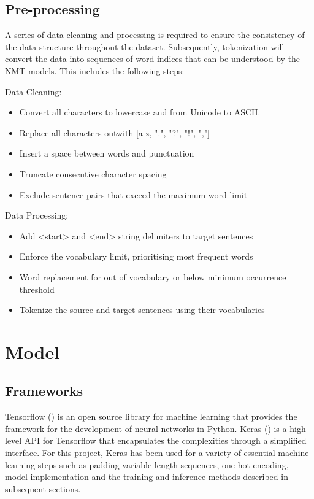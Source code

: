 \subsection{Pre-processing}

A series of data cleaning and processing is required to ensure the consistency of the data structure throughout the dataset. Subsequently, tokenization will convert the data into sequences of word indices that can be understood by the \acrshort{NMT} models. This includes the following steps:

Data Cleaning:
\begin{itemize}
    \item Convert all characters to lowercase and from Unicode to ASCII. %
    \item Replace all characters outwith [a-z, ".", "?", "!", ","]
    \item Insert a space between words and punctuation
    \item Truncate consecutive character spacing
    \item Exclude sentence pairs that exceed the maximum word limit
\end{itemize}

Data Processing:
\begin{itemize}
    \item Add <start> and <end> string delimiters to target sentences
    \item Enforce the vocabulary limit, prioritising most frequent words
    \item Word replacement for out of vocabulary or below minimum occurrence threshold
    \item Tokenize the source and target sentences using their vocabularies
\end{itemize}

\section{Model}
\label{sec:3-model}

\subsection{Frameworks}
\label{sec:3-frameworks}

Tensorflow (\cite{tensorflow_2015}) is an open source library for machine learning that provides the framework for the development of neural networks in Python.
Keras (\cite{keras_2015}) is a high-level API for Tensorflow that encapsulates the complexities through a simplified interface.
For this project, Keras has been used for a variety of essential machine learning steps such as padding variable length sequences, one-hot encoding, model implementation and the training and inference methods described in subsequent sections.


